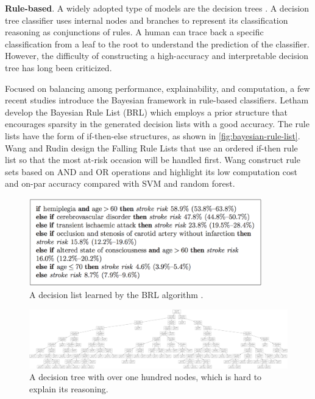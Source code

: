 \textbf{Rule-based}. A widely adopted type of models are the decision trees \cite{breiman1984classificationtree}. A decision tree classifier uses internal nodes and branches to represent its classification reasoning as conjunctions of rules. A human can trace back a specific classification from a leaf to the root to understand the prediction of the classifier. However, the difficulty of constructing a high-accuracy and interpretable decision tree has long been criticized. 

Focused on balancing among performance, explainability, and computation, a few recent studies introduce the Bayesian framework in rule-based classifiers. Letham \etal \cite{letham2015stroke} develop the Bayesian Rule List (BRL) which employs a prior structure that encourages sparsity in the generated decision lists with a good accuracy. The rule lists have the form of if-then-else structures, as shown in \autoref{fig:bayesian-rule-list}. Wang and Rudin \cite{wang2015falling} design the Falling Rule Lists that use an ordered if-then rule list so that the most at-risk occasion will be handled first. Wang \etal \cite{wang2017rulesets} construct rule sets based on AND and OR operations and highlight its low computation cost and on-par accuracy compared with SVM and random forest.


\begin{figure}[tb]
  \centering
  \includegraphics[width=0.9\textwidth]{figure/bayesian-rule-list}
  \caption{A decision list learned by the BRL algorithm \cite{letham2015stroke}.}
  \label{fig:bayesian-rule-list}
\end{figure}

\begin{figure}[tb]
  \centering
  \includegraphics[width=1.0\textwidth]{figure/huge-tree}
  \caption[A decision tree with over one hundred nodes, which is hard to explain its reasoning.]{A decision tree with over one hundred nodes, which is hard to explain its reasoning\footnotemark.}
  \label{fig:huge-tree}
\end{figure}

